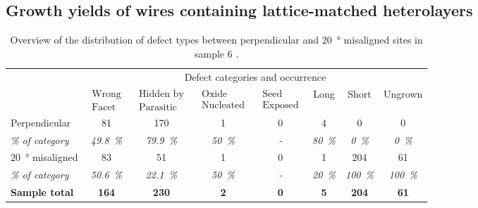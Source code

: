 \subsection{Growth yields of wires containing lattice-matched heterolayers}

\begin{table}
    \centering
    \caption[Overview of the distribution of defect types in sample 6.]{Overview of the distribution of defect types between perpendicular and \qty{20}{\degree} misaligned sites in sample 6 \cite{Brugnolotto2023_2}.}
    \begin{tabular}{l|ccccccc}
        \hline
         & \multicolumn{7}{c}{Defect categories and occurrence} \\ 
         & $\begin{matrix} \text{Wrong} \\ \text{Facet} \end{matrix}$ & $\begin{matrix} \text{Hidden by} \\ \text{Parasitic} \end{matrix}$ & $\begin{matrix} \text{Oxide} \\ \text{Nucleated} \end{matrix}$ & $\begin{matrix} \text{Seed} \\ \text{Exposed} \end{matrix}$ & Long & Short & Ungrown \\ 
        \hline \hline
        Perpendicular & \num{81} & \num{170} & \num{1} & \num{0} & \num{4} & \num{0} & \num{0} \\ 
        \textit{\% of category} & \textit{\qty{49.8}{\%}} & \textit{\qty{79.9}{\%}} & \textit{\qty{50}{\%}} & \textit{-} & \textit{\qty{80}{\%}} & \textit{\qty{0}{\%}} & \textit{\qty{0}{\%}} \\ 
        \hline
        \qty{20}{\degree} misaligned & \num{83} & \num{51} & \num{1} & \num{0} & \num{1} & \num{204} & \num{61} \\ 
        \textit{\% of category} & \textit{\qty{50.6}{\%}} & \textit{\qty{22.1}{\%}} & \textit{\qty{50}{\%}} & \textit{-} & \textit{\qty{20}{\%}} & \textit{\qty{100}{\%}} & \textit{\qty{100}{\%}} \\ 
        \hline
        \textbf{Sample total} & \textbf{\num{164}} & \textbf{\num{230}} & \textbf{\num{2}} & \textbf{\num{0}} & \textbf{\num{5}} & \textbf{\num{204}} & \textbf{\num{61}} \\
        \hline
    \end{tabular}
    \label{tab:defects_s6}
\end{table}

